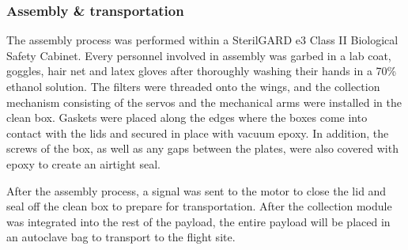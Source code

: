 \subsubsection{Assembly \& transportation}
\label{sec:Assembly}
The assembly process was performed within a SterilGARD e3 Class II Biological Safety Cabinet. Every personnel involved in assembly was garbed in a lab coat, goggles, hair net and latex gloves after thoroughly washing their hands in a 70\% ethanol solution. The filters were threaded onto the wings, and the collection mechanism consisting of the servos and the mechanical arms were installed in the clean box. Gaskets were placed along the edges where the boxes come into contact with the lids and secured in place with vacuum epoxy. In addition, the screws of the box, as well as any gaps between the plates, were also covered with epoxy to create an airtight seal. 

After the assembly process, a signal was sent to the motor to close the lid and seal off the clean box to prepare for transportation. After the collection module was integrated into the rest of the payload, the entire payload will be placed in an autoclave bag to transport to the flight site.

